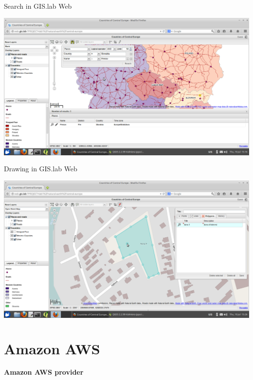 \documentclass[12pt]{beamer}
\begin{document}
\begin{frame}{Search in GIS.lab Web}
	\begin{center}
		\includegraphics[keepaspectratio=true,height=0.7\textheight]{images/rapid-gis-deployment/project-gislab-web-search.png}
	\end{center}
\end{frame}


\begin{frame}{Drawing in GIS.lab Web}
	\begin{center}
		\includegraphics[keepaspectratio=true,height=0.7\textheight]{images/rapid-gis-deployment/project-gislab-web-drawing.png}
	\end{center}
\end{frame}


\section{Amazon AWS}
\begin{frame}
	\begin{center}
		\LARGE\textbf{Amazon AWS provider}
	\end{center}
\end{frame}
\end{document}
